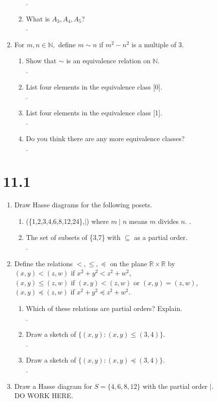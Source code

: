 \documentclass[11pt]{article}
\newcommand{\N}{\mathbb{N}}
\newcommand{\R}{\mathbb{R}}
\begin{document}
\begin{enumerate}
\begin{enumerate}
	.
	\item What is $A_3,A_4,A_5$?\\
	.
	\end{enumerate}
\setcounter{enumi}{11}
\item For $m,n\in\N,$ define $m\sim n$ if $m^2-n^2$ is a multiple of 3.
	\begin{enumerate}
	\item Show that $\sim$ is an equivalence relation on $\N$.\\
	.
	\item List four elements in the equivalence class [0].\\
	.
	\item List four elements in the equivalence class [1].\\
	.
	\item Do you think there are any more equivalence classes?\\
	.
	\end{enumerate}
\end{enumerate}

\section*{11.1}
\begin{enumerate}
\item Draw Hasse diagrams for the following posets.
	\begin{enumerate}
	\item (\{1,2,3,4,6,8,12,24\},$\mid$) where $m\mid n$ means $m$ divides $n$.
	.
	\item The set of subsets of \{3,7\} with $\subseteq$ as a partial order.\\
	.
	\end{enumerate}
\setcounter{enumi}{14}
\item Define the relations $<,\leq,\preceq$ on the plane $\R\times\R$ by\\
$(x,y)<(z,w)$ if $x^2+y^2<z^2+w^2$,\\
$(x,y)\leq(z,w)$ if $(x,y)<(z,w)$ or $(x,y)=(z,w)$,\\
$(x,y)\preceq(z,w)$ if $x^2+y^2\preceq z^2+w^2$.
	\begin{enumerate}
	\item Which of these relations are partial orders? Explain.\\
	.
	\setcounter{enumii}{2}
	\item Draw a sketch of $\{(x,y):(x,y)\leq (3,4)\}$.\\
	.
	\item Draw a sketch of $\{(x,y):(x,y)\preceq (3,4)\}$.\\
	.
	\end{enumerate}
\setcounter{enumi}{0}
\item Draw a Hasse diagram for $S=\{4,6,8,12\}$ with the partial order $\mid$.\\
DO WORK HERE.
\end{enumerate}
\end{document}
